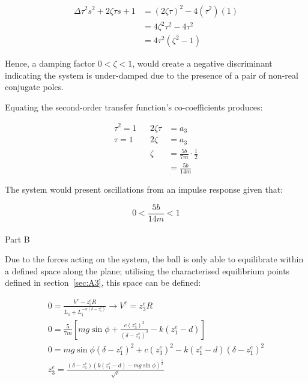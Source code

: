 \documentclass[a4paper,10pt,reqno]{amsart}
\makeatletter
\def\section{\@startsection{section}{1}%
  \z@{.7\linespacing\@plus\linespacing}{.5\linespacing}%
  {\bfseries\scshape\centering}}
\numberwithin{equation}{section}
\makeatother
\begin{document}
\begin{align*}
    \Delta\tau^2s^2+2\zeta\tau s+1&=(2\zeta\tau)^2 - 4(\tau^2)(1)
    \\
    &=4\zeta^2\tau^2-4\tau^2
    \\
    &=4\tau^2(\zeta^2-1)
\end{align*}

Hence, a damping factor $0 < \zeta < 1$, would create a negative discriminant indicating the system is under-damped due to the presence of a pair of non-real conjugate poles.
\\
\par Equating the second-order transfer function's co-coefficients produces:

\begin{align*}
    \tau^2=1 && 2\zeta\tau&=a_3
    \\
    \tau=1 && 2\zeta&=a_3
    \\
    && \zeta &= \frac{5b}{7m} \cdot \frac{1}{2}
    \\
    && &=\frac{5b}{14m}
\end{align*}

\par The system would present oscillations from an impulse response given that:

\begin{equation}
    0 < \frac{5b}{14m} < 1
\end{equation}
\\

\section{Part B}

\par Due to the forces acting on the system, the ball is only able to equilibrate within a defined space along the plane; utilising the characterised equilibrium points defined in section~\ref{sec:A3}, this space can be defined:

\begin{gather*}
    0=\frac{V^e-z_3^eR}{L_o+L_1^{-\alpha(\delta-z_1^e)}} \rightarrow V^e = z_3^eR
    \\
    0 = \frac{5}{7m}[mg\sin{\phi}+\frac{c(z_3^e)^2}{(\delta-z_1^e)^2}-k(z_1^e-d)]
    \\
    0 = mg\sin{\phi}(\delta-z_1^e)^2 + c(z_3^e)^2 - k(z_1^e-d)(\delta-z_1^e)^2
    \\
    z_3^e = \frac{(\delta-z_1^e)(k(z_1^e-d)-mg\sin{\phi})^\frac{1}{2}}{\sqrt{c}}
\end{gather*}
\end{document}
